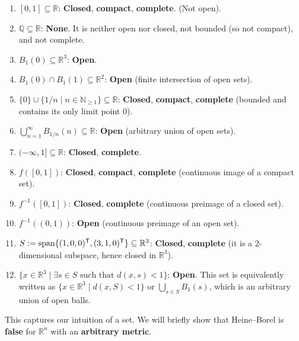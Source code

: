 \begin{exercisesolution*}
\begin{enumerate}[label=\textbf{(\alph*)}]
  \item $[0,1] \subseteq \mathbb{R}$: \textbf{Closed}, \textbf{compact}, \textbf{complete}. (Not open).
  \item $\mathbb{Q} \subseteq \mathbb{R}$: \textbf{None}. It is neither open nor closed, not bounded (so not compact), and not complete.
  \item $B_1(0) \subseteq \mathbb{R}^3$: \textbf{Open}.
  \item $B_1(0) \cap B_1(1) \subseteq \mathbb{R}^2$: \textbf{Open} (finite intersection of open sets).
  \item $\{0\} \cup \{1/n \mid n \in \mathbb{N}_{\ge 1}\} \subseteq \mathbb{R}$: \textbf{Closed}, \textbf{compact}, \textbf{complete} (bounded and contains its only limit point $0$).
  \item $\bigcup_{n=1}^\infty B_{1/n}(n) \subseteq \mathbb{R}$: \textbf{Open} (arbitrary union of open sets).
  \item $(-\infty, 1] \subseteq \mathbb{R}$: \textbf{Closed}, \textbf{complete}.
  \item $f([0,1])$: \textbf{Closed}, \textbf{compact}, \textbf{complete} (continuous image of a compact set).
  \item $f^{-1}([0,1])$: \textbf{Closed}, \textbf{complete} (continuous preimage of a closed set).
  \item $f^{-1}((0,1))$: \textbf{Open} (continuous preimage of an open set).
  \item $S := \operatorname{span}\{(1,0,0)^{\mathsf{T}}, (3,1,0)^{\mathsf{T}}\} \subseteq \mathbb{R}^3$: \textbf{Closed}, \textbf{complete} (it is a $2$-dimensional subspace, hence closed in $\mathbb{R}^3$).
  \item $\{x \in \mathbb{R}^3 \mid \exists s \in S \text{ such that } d(x, s) < 1\}$: \textbf{Open}. This set is equivalently written as $\{x \in \mathbb{R}^3 \mid d(x, S) < 1\}$ or $\bigcup_{s \in S} B_1(s)$, which is an arbitrary union of open balls.
\end{enumerate}
\end{exercisesolution*}

This captures our intuition of a  set. We will briefly show that Heine--Borel is
\textbf{false} for $\mathbb{R}^n$ with an \textbf{arbitrary metric}.

